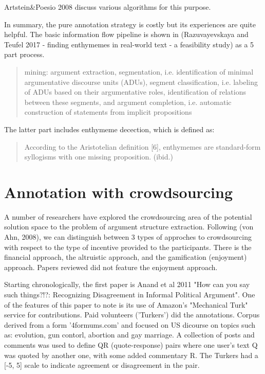 \documentclass{report}
\begin{document}
Artstein&Poesio 2008 discuss various algorithms for this purpose.

In summary, the pure annotation strategy is costly but its experiences are quite helpful. The basic information flow pipeline is shown in (Razuvayevskaya and Teufel 2017 - finding enthymemes in real-world text - a feasibility study) as a 5 part process.
\begin{quote}
   mining: argument extraction, segmentation, i.e. identification of minimal argumentative discourse units (ADUs), segment classification, i.e. labeling of ADUs based on their argumentative roles, identification of relations between these segments, and argument completion, i.e. automatic construction of statements from implicit propositions
\end{quote}
\cite[page 114]{Tefuel2017}


The latter part includes enthymeme decection, which is defined as:
\begin{quote}
According to the Aristotelian definition [6], enthymemes are standard-form syllogisms with one missing proposition.  (ibid.)
\end{quote}
\cite[page 113]{Tefuel2017}

\section{Annotation with crowdsourcing}
A number of researchers have explored the crowdsourcing area of the potential solution space to the problem of argument structure extraction.
Following (von Ahn, 2008), we can distinguish between 3 types of approches to crowdsourcing with respect to the type of incentive provided to the participants.
There is the financial approach, the altruistic approach, and the gamification (enjoyment) approach. Papers reviewed did not feature the enjoyment approach.

Starting chronologically, the first paper is Anand et al 2011 "How can you say such things?!?: Recognizing Disagreement in Informal Political Argument".
One of the features of this paper to note is its use of Amazon's "Mechanical Turk" service for contributions. Paid volunteers ('Turkers') did the annotations. 
Corpus derived from a form '4formums.com' and focused on US dicourse on topics such as: evolution, gun contorl, abortion and gay marriage. A collection of posts and comments was used to define QR (quote-response) pairs where one user's text Q was quoted by another one, with some added commentary R. The Turkers had a [-5, 5] scale to indicate agreement or disagreement in the pair.
\end{document}
